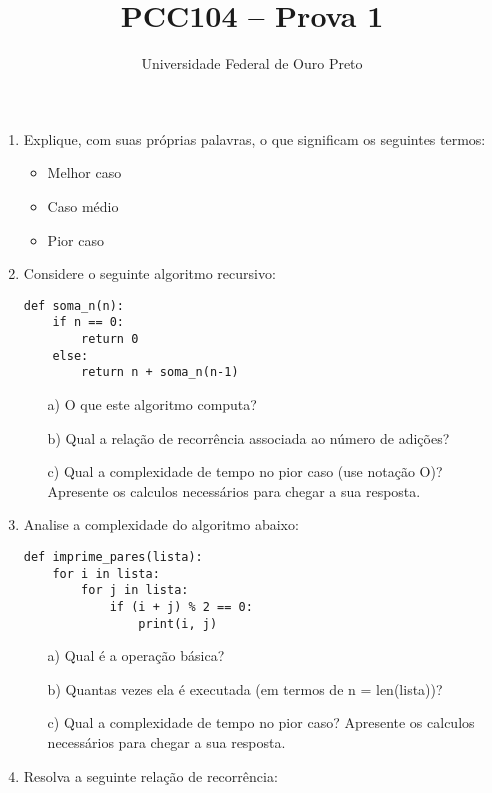 \documentclass[12pt]{article}
\title{PCC104 – Prova 1}
\author{Universidade Federal de Ouro Preto}
\date{}
\begin{document}
\maketitle


\begin{enumerate}

\item  Explique, com suas próprias palavras, o que significam os seguintes termos:
\begin{itemize}
  \item Melhor caso
  \item Caso médio
  \item Pior caso
\end{itemize}

\item Considere o seguinte algoritmo recursivo:

\begin{verbatim}
def soma_n(n):
    if n == 0:
        return 0
    else:
        return n + soma_n(n-1)
\end{verbatim}

\begin{itemize}
  \item[a)] O que este algoritmo computa?
  \item[b)] Qual a relação de recorrência associada ao número de adições?
  \item[c)] Qual a complexidade de tempo no pior caso (use notação O)? Apresente os calculos necessários para chegar a sua resposta.
\end{itemize}

\item Analise a complexidade do algoritmo abaixo:

\begin{verbatim}
def imprime_pares(lista):
    for i in lista:
        for j in lista:
            if (i + j) % 2 == 0:
                print(i, j)
\end{verbatim}

\begin{itemize}
  \item[a)] Qual é a operação básica?
  \item[b)] Quantas vezes ela é executada (em termos de n = len(lista))?
  \item[c)] Qual a complexidade de tempo no pior caso?  Apresente os calculos necessários para chegar a sua resposta.
\end{itemize}

\item Resolva a seguinte relação de recorrência:


\end{enumerate}
\end{document}
